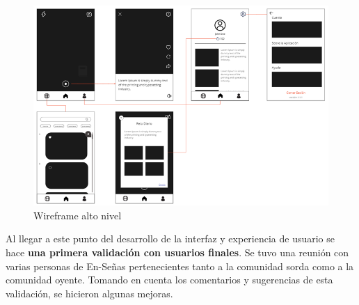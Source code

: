 \begin{itemize}
        \begin{figure}[H]
            \centering
            \includegraphics[width=1\linewidth]{figuras/fireframe_alta1.png}
            \caption{Wireframe alto nivel}
            \label{fig:enter-label}
        \end{figure}
    
\end{itemize}

Al llegar a este punto del desarrollo de la interfaz y experiencia de usuario se hace\textbf{ una primera validación con usuarios finales}. Se tuvo una reunión con varias personas de En-Señas pertenecientes tanto a la comunidad sorda como a la comunidad oyente. Tomando en cuenta los comentarios y sugerencias de esta validación, se hicieron algunas mejoras.


